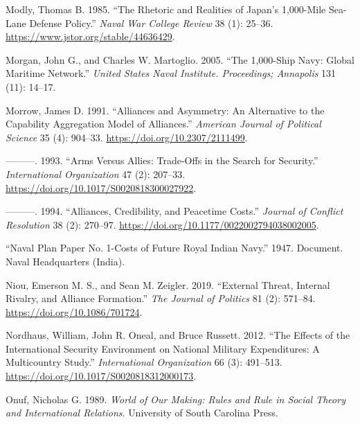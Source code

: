 \documentclass[
  12,
  letterpaper,
  DIV=11,
  numbers=noendperiod]{scrartcl}
\newlength{\cslhangindent}
\newlength{\cslentryspacingunit} %
\newenvironment{CSLReferences}[2] %
 {%
  \setlength{\parindent}{0pt}
  \ifodd #1
  \let\oldpar\par
  \def\par{\hangindent=\cslhangindent\oldpar}
  \fi
  \setlength{\parskip}{#2\cslentryspacingunit}
 }%
 {}
\begin{document}
\begin{CSLReferences}{1}{0}
\leavevmode{}%
Modly, Thomas B. 1985. {``The {Rhetoric} and {Realities} of {Japan}'s
1,000-{Mile Sea-Lane Defense Policy}.''} \emph{Naval War College Review}
38 (1): 25--36. \url{https://www.jstor.org/stable/44636429}.

\leavevmode{}%
Morgan, John G., and Charles W. Martoglio. 2005. {``The 1,000-{Ship
Navy}: {Global Maritime Network}.''} \emph{United States Naval
Institute. Proceedings; Annapolis} 131 (11): 14--17.

\leavevmode{}%
Morrow, James D. 1991. {``Alliances and {Asymmetry}: {An Alternative} to
the {Capability Aggregation Model} of {Alliances}.''} \emph{American
Journal of Political Science} 35 (4): 904--33.
\url{https://doi.org/10.2307/2111499}.

\leavevmode{}%
---------. 1993. {``Arms Versus Allies: Trade-Offs in the Search for
Security.''} \emph{International Organization} 47 (2): 207--33.
\url{https://doi.org/10.1017/S0020818300027922}.

\leavevmode{}%
---------. 1994. {``Alliances, {Credibility}, and {Peacetime Costs}.''}
\emph{Journal of Conflict Resolution} 38 (2): 270--97.
\url{https://doi.org/10.1177/0022002794038002005}.

\leavevmode{}%
{``Naval {Plan Paper No}. 1-{Costs} of {Future Royal Indian Navy}.''}
1947. Document. {Naval Headquarters (India)}.

\leavevmode{}%
Niou, Emerson M. S., and Sean M. Zeigler. 2019. {``External {Threat},
{Internal Rivalry}, and {Alliance Formation}.''} \emph{The Journal of
Politics} 81 (2): 571--84. \url{https://doi.org/10.1086/701724}.

\leavevmode{}%
Nordhaus, William, John R. Oneal, and Bruce Russett. 2012. {``The
{Effects} of the {International Security Environment} on {National
Military Expenditures}: {A Multicountry Study}.''} \emph{International
Organization} 66 (3): 491--513.
\url{https://doi.org/10.1017/S0020818312000173}.

\leavevmode{}%
Onuf, Nicholas G. 1989. \emph{World of Our Making: Rules and Rule in
Social Theory and International Relations}. {University of South
Carolina Press}.


\end{CSLReferences}
\end{document}
